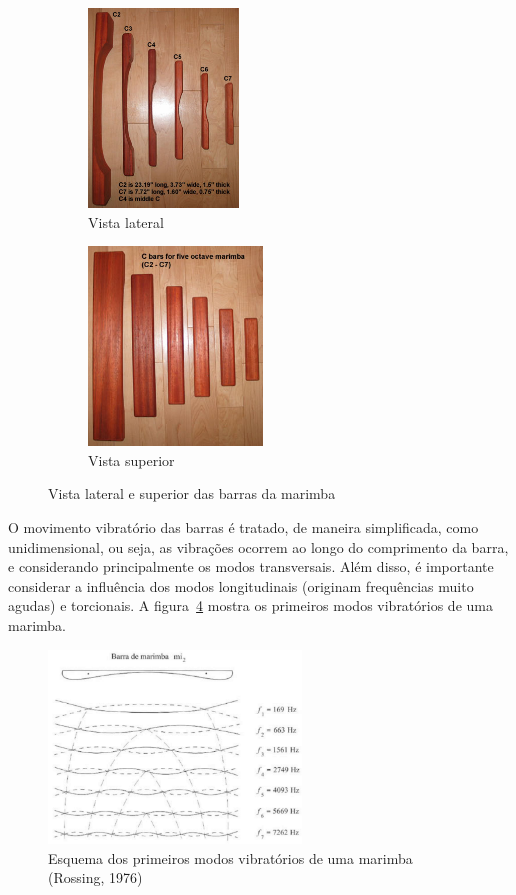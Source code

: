 \documentclass{article}
\begin{document}
\begin{figure}[h!]
	\centering
	\begin{subfigure}{0.45\textwidth}
		\centering
		\includegraphics[height=200px]{marimba_bars.jpg}
		\caption{Vista lateral}
		\label{fig:marimba_bars_side}
	\end{subfigure}
	\hfill
	\begin{subfigure}{0.45\textwidth}
		\centering
		\includegraphics[height=200px]{marimba_bars-top.jpg}
		\caption{Vista superior}
		\label{fig:marimba_bars_top}
	\end{subfigure}
	\caption{Vista lateral e superior das barras da marimba~\cite{lafavre_tuning_marimba}}
	\label{fig:marimba_bars}
\end{figure}

O movimento vibratório das barras é tratado, de maneira simplificada, como unidimensional, ou seja, as vibrações ocorrem ao longo do comprimento da barra, e considerando principalmente os modos transversais. Além disso, é importante considerar a influência dos modos longitudinais (originam frequências muito agudas) e torcionais. A figura~\ref{fig:modos_vibratorios} mostra os primeiros modos vibratórios de uma marimba.

\begin{figure}[h!]
	\centering
	\includegraphics[width=0.6\textwidth]{modos_vibratorios.png}
	\caption{Esquema dos primeiros modos vibratórios de uma marimba (Rossing, 1976)~\cite{henrique2002acústica}}
	\label{fig:modos_vibratorios}
\end{figure}
\end{document}
